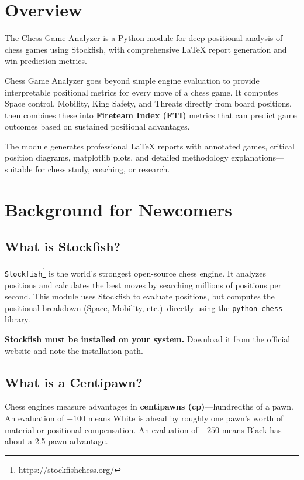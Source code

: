 \documentclass[12pt]{book}
\begin{document}
\section{Overview}

The Chess Game Analyzer is a Python module for deep positional analysis of chess games using Stockfish, with comprehensive \LaTeX{} report generation and win prediction metrics.

Chess Game Analyzer goes beyond simple engine evaluation to provide interpretable positional metrics for every move of a chess game. It computes Space control, Mobility, King Safety, and Threats directly from board positions, then combines these into \textbf{Fireteam Index (FTI)} metrics that can predict game outcomes based on sustained positional advantages.

The module generates professional \LaTeX{} reports with annotated games, critical position diagrams, matplotlib plots, and detailed methodology explanations---suitable for chess study, coaching, or research.


\section{Background for Newcomers}

\subsection{What is Stockfish?}

{\tt Stockfish}\footnote{\url{https://stockfishchess.org/}} is the world's strongest open-source chess engine. It analyzes positions and calculates the best moves by searching millions of positions per second. This module uses Stockfish to evaluate positions, but computes the positional breakdown (Space, Mobility, etc.)\ directly using the {\tt python-chess} library.

\textbf{Stockfish must be installed on your system.} Download it from the
official website and note the installation path.

\subsection{What is a Centipawn?}

Chess engines measure advantages in \textbf{centipawns (cp)}---hundredths of a pawn. An evaluation of $+100$ means White is ahead by roughly one pawn's worth of material or positional compensation. An evaluation of $-250$ means Black has about a 2.5 pawn advantage.
\end{document}
